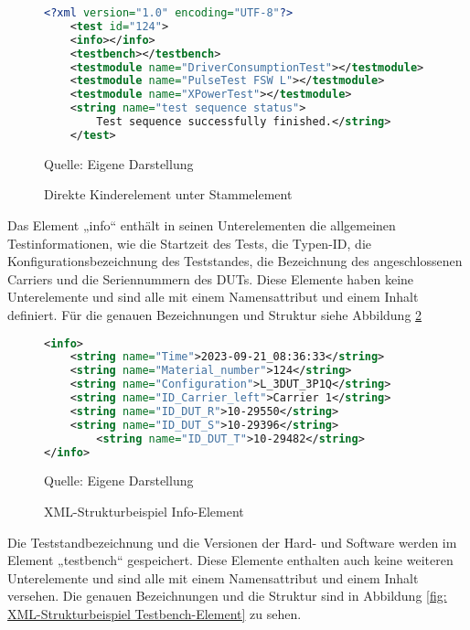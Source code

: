 \begin{figure}[H]
\centering
\begin{minipage}{0.95\textwidth}
\begin{lstlisting}[language=XML]
<?xml version="1.0" encoding="UTF-8"?>
    <test id="124">
    <info></info>
    <testbench></testbench>
    <testmodule name="DriverConsumptionTest"></testmodule>
    <testmodule name="PulseTest FSW L"></testmodule>
    <testmodule name="XPowerTest"></testmodule>
    <string name="test sequence status">
        Test sequence successfully finished.</string>
    </test>
\end{lstlisting}
\end{minipage}
\caption{Direkte Kinderelement unter Stammelement}
\label{fig: Direkte Kinderelement unter Stammelement}
    {Quelle: Eigene Darstellung}
\end{figure}


Das Element „info“ enthält in seinen Unterelementen die allgemeinen Testinformationen, wie die Startzeit des Tests,
die Typen-ID, die Konfigurationsbezeichnung des Teststandes, die Bezeichnung des angeschlossenen Carriers und die
Seriennummern des \ac{DUTs}. Diese Elemente haben keine Unterelemente und sind alle mit einem Namensattribut und einem Inhalt definiert.
Für die genauen Bezeichnungen und Struktur siehe Abbildung \ref{fig: XML-Strukturbeispiel Info-Element}

\begin{figure}[H]
\centering
\begin{minipage}{0.95\textwidth}
\begin{lstlisting}[language=XML]
<info>
	<string name="Time">2023-09-21_08:36:33</string>
	<string name="Material_number">124</string>
	<string name="Configuration">L_3DUT_3P1Q</string>
	<string name="ID_Carrier_left">Carrier 1</string>
	<string name="ID_DUT_R">10-29550</string>
	<string name="ID_DUT_S">10-29396</string>
        <string name="ID_DUT_T">10-29482</string>
</info>
\end{lstlisting}
\end{minipage}
\caption{XML-Strukturbeispiel Info-Element}
\label{fig: XML-Strukturbeispiel Info-Element}
    {Quelle: Eigene Darstellung}
\end{figure}

Die Teststandbezeichnung und die Versionen der Hard- und Software werden im Element „testbench“ gespeichert.
Diese Elemente enthalten auch keine weiteren Unterelemente und sind alle mit einem Namensattribut und einem Inhalt versehen.
Die genauen Bezeichnungen und die Struktur sind in Abbildung \ref{fig: XML-Strukturbeispiel Testbench-Element} zu sehen.

